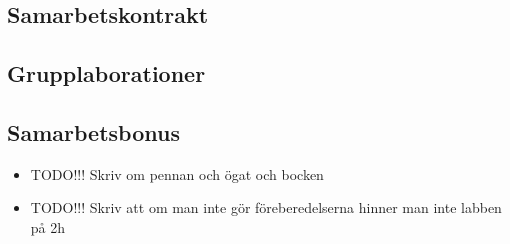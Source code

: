 

\subsection*{Samarbetskontrakt}
\subsection*{Grupplaborationer}
\subsection*{Samarbetsbonus}
 
\begin{itemize}
\item TODO!!! Skriv om pennan och ögat och bocken
\item TODO!!! Skriv att om man inte gör föreberedelserna hinner man inte labben på 2h
\end{itemize}
